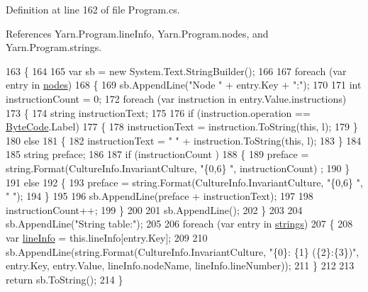 Definition at line 162 of file Program.\-cs.



References Yarn.\-Program.\-line\-Info, Yarn.\-Program.\-nodes, and Yarn.\-Program.\-strings.


\begin{DoxyCode}
163         \{
164 
165             var sb = \textcolor{keyword}{new} System.Text.StringBuilder();
166 
167             \textcolor{keywordflow}{foreach} (var entry \textcolor{keywordflow}{in} \hyperlink{a00154_a3f4928a577c88263ad016be259b175c4}{nodes})
168             \{
169                 sb.AppendLine(\textcolor{stringliteral}{"Node "} + entry.Key + \textcolor{stringliteral}{":"});
170 
171                 \textcolor{keywordtype}{int} instructionCount = 0;
172                 \textcolor{keywordflow}{foreach} (var instruction \textcolor{keywordflow}{in} entry.Value.instructions)
173                 \{
174                     \textcolor{keywordtype}{string} instructionText;
175 
176                     \textcolor{keywordflow}{if} (instruction.operation == \hyperlink{a00053_ad5dfb6ee68ca7469623ad3e459f98894}{ByteCode}.Label)
177                     \{
178                         instructionText = instruction.ToString(\textcolor{keyword}{this}, l);
179                     \}
180                     \textcolor{keywordflow}{else}
181                     \{
182                         instructionText = \textcolor{stringliteral}{"    "} + instruction.ToString(\textcolor{keyword}{this}, l);
183                     \}
184 
185                     \textcolor{keywordtype}{string} preface;
186 
187                     \textcolor{keywordflow}{if} (instructionCount %
      )
188                     \{
189                         preface = string.Format(CultureInfo.InvariantCulture, \textcolor{stringliteral}{"\{0,6\}   "}, instructionCount)
      ;
190                     \}
191                     \textcolor{keywordflow}{else}
192                     \{
193                         preface = string.Format(CultureInfo.InvariantCulture, \textcolor{stringliteral}{"\{0,6\}   "}, \textcolor{stringliteral}{" "});
194                     \}
195 
196                     sb.AppendLine(preface + instructionText);
197 
198                     instructionCount++;
199                 \}
200 
201                 sb.AppendLine();
202             \}
203 
204             sb.AppendLine(\textcolor{stringliteral}{"String table:"});
205 
206             \textcolor{keywordflow}{foreach} (var entry \textcolor{keywordflow}{in} \hyperlink{a00154_a59263e00cecfe36d9881b4c30b048f09}{strings})
207             \{
208                 var \hyperlink{a00154_a0d4da395947767b4a1eaaff8a9842adc}{lineInfo} = this.lineInfo[entry.Key];
209 
210                 sb.AppendLine(string.Format(CultureInfo.InvariantCulture, \textcolor{stringliteral}{"\{0\}: \{1\} (\{2\}:\{3\})"}, entry.Key, 
      entry.Value, lineInfo.nodeName, lineInfo.lineNumber));
211             \}
212 
213             \textcolor{keywordflow}{return} sb.ToString();
214         \}
\end{DoxyCode}
